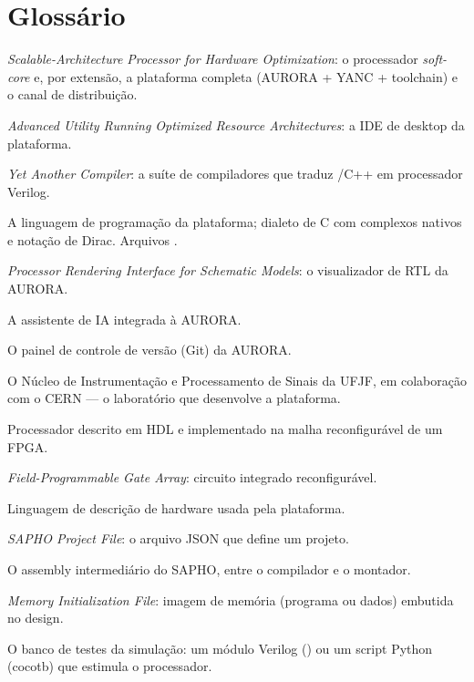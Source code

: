 \chapter{Glossário}
\label{ap:glossario}

\begin{description}[style=nextline,font=\bfseries]
  \item[SAPHO] \emph{Scalable-Architecture Processor for Hardware Optimization}: o processador \emph{soft-core} e, por extensão, a plataforma completa (AURORA + YANC + toolchain) e o canal de distribuição.
  \item[AURORA] \emph{Advanced Utility Running Optimized Resource Architectures}: a IDE de desktop da plataforma.
  \item[YANC] \emph{Yet Another Compiler}: a suíte de compiladores que traduz \cmm{}/C++ em processador Verilog.
  \item[\cmm{} (CMM)] A linguagem de programação da plataforma; dialeto de C com complexos nativos e notação de Dirac. Arquivos .
  \item[PRISM] \emph{Processor Rendering Interface for Schematic Models}: o visualizador de RTL da AURORA.
  \item[Aurora Intelligence] A assistente de IA integrada à AURORA.
  \item[Dagr] O painel de controle de versão (Git) da AURORA.
  \item[NIPS-CERN] O Núcleo de Instrumentação e Processamento de Sinais da UFJF, em colaboração com o CERN --- o laboratório que desenvolve a plataforma.
  \item[soft-processor / soft-core] Processador descrito em HDL e implementado na malha reconfigurável de um FPGA.
  \item[FPGA] \emph{Field-Programmable Gate Array}: circuito integrado reconfigurável.
  \item[Verilog / HDL] Linguagem de descrição de hardware usada pela plataforma.
  \item[\file{.spf}] \emph{SAPHO Project File}: o arquivo JSON que define um projeto.
  \item[\file{.asm}] O assembly intermediário do SAPHO, entre o compilador e o montador.
  \item[\file{.mif}] \emph{Memory Initialization File}: imagem de memória (programa ou dados) embutida no design.
  \item[testbench] O banco de testes da simulação: um módulo Verilog () ou um script Python (cocotb) que estimula o processador.

\end{description}
